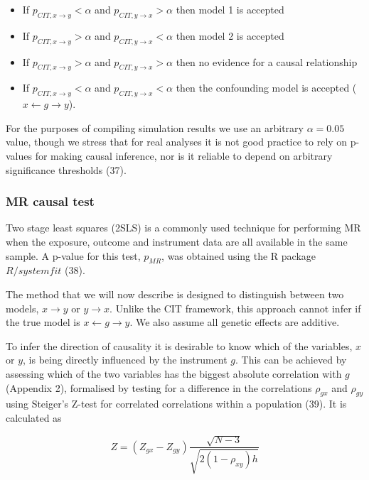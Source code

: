 \documentclass[]{article}
\providecommand{\tightlist}{%
  \setlength{\itemsep}{0pt}\setlength{\parskip}{0pt}}
\begin{document}
\begin{itemize}
\tightlist
\item
  If \(p_{CIT, x \rightarrow y} < \alpha\) and
  \(p_{CIT, y \rightarrow x} > \alpha\) then model 1 is accepted
\item
  If \(p_{CIT, x \rightarrow y} > \alpha\) and
  \(p_{CIT, y \rightarrow x} < \alpha\) then model 2 is accepted
\item
  If \(p_{CIT, x \rightarrow y} > \alpha\) and
  \(p_{CIT, y \rightarrow x} > \alpha\) then no evidence for a causal
  relationship
\item
  If \(p_{CIT, x \rightarrow y} < \alpha\) and
  \(p_{CIT, y \rightarrow x} < \alpha\) then the confounding model is
  accepted (\(x \leftarrow g \rightarrow y\)).
\end{itemize}

For the purposes of compiling simulation results we use an arbitrary
\(\alpha = 0.05\) value, though we stress that for real analyses it is
not good practice to rely on p-values for making causal inference, nor
is it reliable to depend on arbitrary significance thresholds (37).

\subsubsection{MR causal test}\label{mr-causal-test}

Two stage least squares (2SLS) is a commonly used technique for
performing MR when the exposure, outcome and instrument data are all
available in the same sample. A p-value for this test, \(p_{MR}\), was
obtained using the R package \(R/systemfit\) (38).

The method that we will now describe is designed to distinguish between
two models, \(x \rightarrow y\) or \(y \rightarrow x\). Unlike the CIT
framework, this approach cannot infer if the true model is
\(x \leftarrow g \rightarrow y\). We also assume all genetic effects are
additive.

To infer the direction of causality it is desirable to know which of the
variables, \(x\) or \(y\), is being directly influenced by the
instrument \(g\). This can be achieved by assessing which of the two
variables has the biggest absolute correlation with \(g\) (Appendix 2),
formalised by testing for a difference in the correlations \(\rho_{gx}\)
and \(\rho_{gy}\) using Steiger's Z-test for correlated correlations
within a population (39). It is calculated as

\[
Z = (Z_{gx} - Z_{gy}) \frac{\sqrt{N-3}}{\sqrt{2(1-\rho_{xy})h}}
\]
\end{document}
